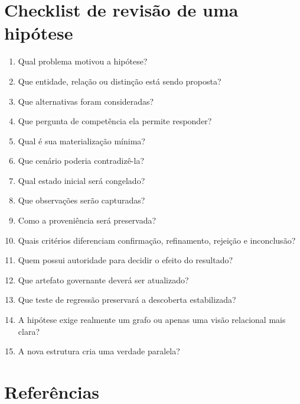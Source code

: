 \documentclass[11pt,a4paper,oneside]{article}
\begin{document}
\section{Checklist de revisão de uma hipótese}

\begin{enumerate}
  \item Qual problema motivou a hipótese?
  \item Que entidade, relação ou distinção está sendo proposta?
  \item Que alternativas foram consideradas?
  \item Que pergunta de competência ela permite responder?
  \item Qual é sua materialização mínima?
  \item Que cenário poderia contradizê-la?
  \item Qual estado inicial será congelado?
  \item Que observações serão capturadas?
  \item Como a proveniência será preservada?
  \item Quais critérios diferenciam confirmação, refinamento, rejeição e inconclusão?
  \item Quem possui autoridade para decidir o efeito do resultado?
  \item Que artefato governante deverá ser atualizado?
  \item Que teste de regressão preservará a descoberta estabilizada?
  \item A hipótese exige realmente um grafo ou apenas uma visão relacional mais clara?
  \item A nova estrutura cria uma verdade paralela?
\end{enumerate}

\section{Referências}
\end{document}
